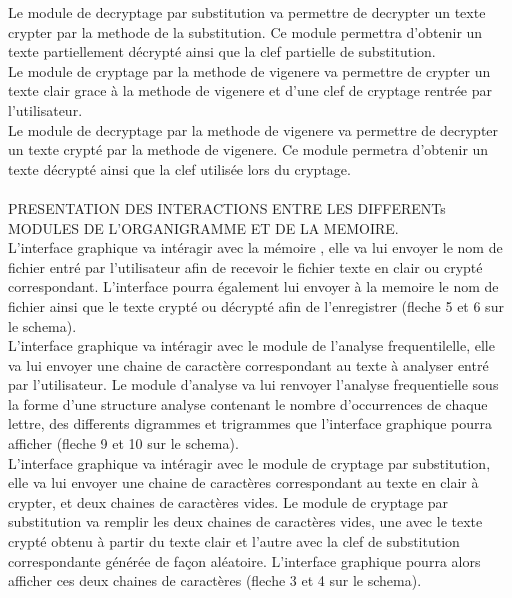 \documentclass[a4]{article}
\begin{document}
	Le module de decryptage par substitution va permettre de decrypter un texte crypter par la methode de la substitution.
	 Ce module permettra d'obtenir un texte partiellement décrypté ainsi que la clef partielle de substitution. \\

	Le module de cryptage par la methode de vigenere va permettre de crypter un texte clair grace à la methode de vigenere
	 et d'une clef de cryptage rentrée par l'utilisateur. \\

	Le module de decryptage par la methode de vigenere va permettre de decrypter un texte crypté par la methode de vigenere. 
	Ce module permetra d'obtenir un texte décrypté ainsi que la clef utilisée lors du cryptage. \\ \\

	
PRESENTATION DES INTERACTIONS ENTRE LES DIFFERENTs MODULES DE L'ORGANIGRAMME ET DE LA MEMOIRE. \\

	L'interface graphique va intéragir avec la mémoire , elle va lui envoyer le nom de fichier entré par l'utilisateur 
	afin de recevoir le fichier texte en clair ou crypté correspondant. L'interface pourra également lui envoyer à la 
	memoire le nom de fichier ainsi que le texte crypté ou décrypté afin de l'enregistrer (fleche 5 et 6 sur le schema). \\

	L'interface graphique va intéragir avec le module de l'analyse frequentilelle, elle va lui envoyer une chaine de 
	caractère correspondant au texte à analyser entré par l'utilisateur. Le module d'analyse va lui renvoyer l'analyse 
	frequentielle sous la forme d'une structure analyse contenant le nombre d'occurrences de chaque lettre, des differents
	 digrammes et trigrammes que l'interface graphique pourra afficher (fleche 9 et 10 sur le schema). \\

	L'interface graphique va intéragir avec le module de cryptage par substitution, elle va lui envoyer une 
	chaine de caractères correspondant au texte en clair à crypter, et deux chaines de caractères vides. Le module
	 de cryptage par substitution va remplir les deux chaines de caractères vides, une avec le texte crypté obtenu
	  à partir du texte clair et l'autre avec la clef de substitution correspondante générée de façon aléatoire.
	   L'interface graphique pourra alors afficher ces deux chaines de caractères (fleche 3 et 4 sur le schema). \\
\end{document}
